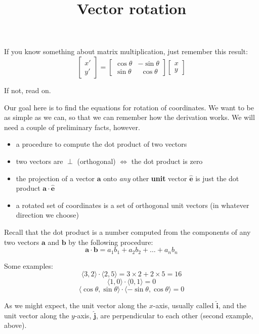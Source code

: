 \documentclass[11pt, oneside]{article}   	%
\title{Vector rotation}
\date{}
\begin{document}
\maketitle
\Large
If you know something about matrix multiplication, just remember this result:
\[
\begin{bmatrix}  x' \\ y' \end{bmatrix}
=
\begin{bmatrix}  
\cos \theta & -\sin \theta \\
\sin \theta & \ \  \cos \theta 
\end{bmatrix}
\begin{bmatrix}  x \\ y \end{bmatrix}
\]

If not, read on.

Our goal here is to find the equations for rotation of coordinates.  We want to be as simple as we can, so that we can remember how the derivation works.  We will need a couple of preliminary facts, however.

\begin{itemize}
\item a procedure to compute the dot product of two vectors
\item two vectors are $\perp$ (orthogonal) $\iff$ the dot product is zero
\item the projection of a vector $\mathbf{a}$ onto \emph{any} other \textbf{unit} vector $\mathbf{\hat{e}}$ is just the dot product $\mathbf{a} \cdot \mathbf{\hat{e}}$ 
\item a rotated set of coordinates is a set of orthogonal unit vectors (in whatever direction we choose)
\end{itemize}

Recall that the dot product is a number computed from the components of any two vectors $\mathbf{a}$ and $\mathbf{b}$ by the following procedure:
\[ \mathbf{a} \cdot \mathbf{b} = a_1 b_1 + a_2 b_2 + \dots + a_n b_n \]

Some examples:
\[ \langle 3, 2 \rangle \cdot  \langle 2, 5 \rangle = 3 \times 2 + 2 \times 5 = 16 \]
\[ \langle 1, 0 \rangle \cdot  \langle 0, 1 \rangle = 0 \]
\[ \langle \cos \theta, \sin \theta \rangle \cdot  \langle -\sin \theta, \cos \theta \rangle = 0 \]

As we might expect, the unit vector along the $x$-axis, usually called $\hat{\mathbf{i}}$, and the unit vector along the $y$-axis, $\hat{\mathbf{j}}$, are perpendicular to each other (second example, above).
\end{document}
